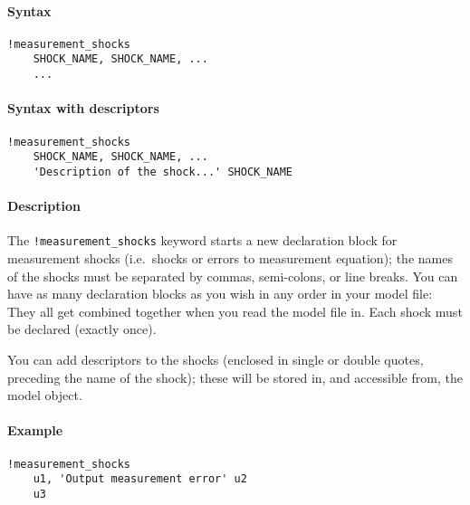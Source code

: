 


	\paragraph{Syntax}

\begin{verbatim}
!measurement_shocks
    SHOCK_NAME, SHOCK_NAME, ...
    ...
\end{verbatim}

\paragraph{Syntax with descriptors}

\begin{verbatim}
!measurement_shocks
    SHOCK_NAME, SHOCK_NAME, ...
    'Description of the shock...' SHOCK_NAME
\end{verbatim}

\paragraph{Description}

The \texttt{!measurement\_shocks} keyword starts a new declaration block
for measurement shocks (i.e.~shocks or errors to measurement equation);
the names of the shocks must be separated by commas, semi-colons, or
line breaks. You can have as many declaration blocks as you wish in any
order in your model file: They all get combined together when you read
the model file in. Each shock must be declared (exactly once).

You can add descriptors to the shocks (enclosed in single or double
quotes, preceding the name of the shock); these will be stored in, and
accessible from, the model object.

\paragraph{Example}

\begin{verbatim}
!measurement_shocks
    u1, 'Output measurement error' u2
    u3
\end{verbatim}


